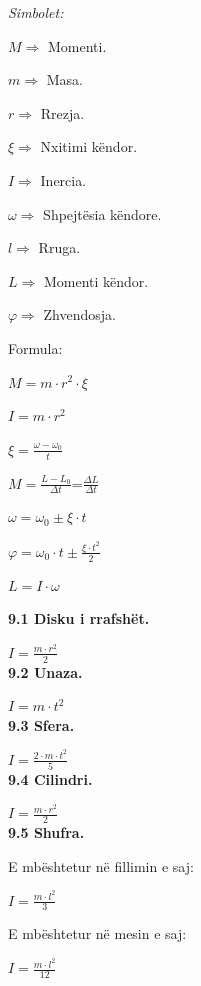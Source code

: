 \documentclass[twocolumn]{article}
\begin{document}
	
	
	\begin{center}
		\textit{Simbolet:}
	\end{center}
	
	$M \Rightarrow$ Momenti.
	
	$m \Rightarrow $ Masa.
	
	$r \Rightarrow$ Rrezja.
	
	$\xi \Rightarrow $ Nxitimi këndor.
	
	$I \Rightarrow$ Inercia.
	
	$\omega \Rightarrow$ Shpejtësia këndore.
	
	$l \Rightarrow$ Rruga.
	
	$L \Rightarrow$ Momenti këndor.
	
	$\varphi \Rightarrow$ Zhvendosja.
	
	\begin{center}
		Formula:
	\end{center}
	
	$M= m \cdot r^2 \cdot \xi$
	
	$I= m \cdot r^2$
	
	$\xi=\frac{\omega - \omega_0}{t}$
	
	$M=\frac{L-L_0}{\Delta t}$=$\frac{\Delta L}{\Delta t}$
	
	$\omega=\omega_0 \pm \xi \cdot t$
	
	$\varphi = \omega_0 \cdot t \pm \frac{\xi \cdot t^2}{2}$
	
	$L=I\cdot \omega$
	
	\textbf{9.1 Disku i rrafshët.}
	
	$I= \frac{m \cdot r^2}{2}$\\
	
	\textbf{9.2 Unaza.}
	
	$I=m \cdot t^2$\\
	
	\textbf{9.3 Sfera.}
	
	$I=\frac{2 \cdot m \cdot t^2}{5}$\\
	
	\textbf{9.4 Cilindri.}
	
	$I= \frac{m \cdot r^2}{2}$\\
	
	\textbf{9.5 Shufra.}
	
	E mbështetur në fillimin e saj:
	
	$I=\frac{m \cdot l^2}{3}$
	
	E mbështetur në mesin e saj:
	
	$I=\frac{m \cdot l^2}{12}$
	
\end{document}
